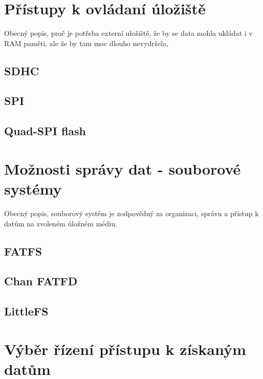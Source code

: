 \section{Přístupy k ovládaní úložiště}
Obecný popis, proč je potřeba externí uložiště, že by se data mohla ukládat i v RAM paměti, ale že by tam moc dlouho nevydržela, 

\subsection{SDHC}

\subsection{SPI}

\subsection{Quad-SPI flash}


\section{Možnosti správy dat - souborové systémy} 
Obecný popis, souborový systém je zodpovědný za organizaci, správu a přístup k datům na zvoleném úložném médiu.

\subsection{FATFS}

\subsection{Chan FATFD}

\subsection{LittleFS}



\section{Výběr řízení přístupu k získaným datům}

